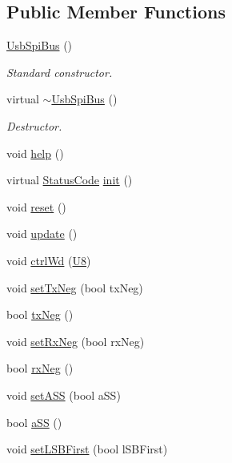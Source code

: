 \subsection*{Public Member Functions}
\begin{DoxyCompactItemize}
\item 
\hyperlink{classUsbSpiBus_a75b47c1938d8ee80eb3a32f19765b05e}{UsbSpiBus} ()
\begin{DoxyCompactList}\small\item\em Standard constructor. \item\end{DoxyCompactList}\item 
virtual \hyperlink{classUsbSpiBus_abeabcef3ac01134582fe275c89b9922f}{$\sim$UsbSpiBus} ()
\begin{DoxyCompactList}\small\item\em Destructor. \item\end{DoxyCompactList}\item 
void \hyperlink{classUsbSpiBus_a3543b3bbad0c137fde32fdc554a09a5d}{help} ()
\item 
virtual \hyperlink{classStatusCode}{StatusCode} \hyperlink{classUsbSpiBus_a38203aaf0806b9a1c7cc0686831a7ce9}{init} ()
\item 
void \hyperlink{classUsbSpiBus_aa795a27f7429f0c0285056964659d433}{reset} ()
\item 
void \hyperlink{classUsbSpiBus_a3e26195827351bf88db56dafd1e7de26}{update} ()
\item 
void \hyperlink{classUsbSpiBus_a150304008d73d14c93d25765050ddb05}{ctrlWd} (\hyperlink{classUsbSpiBus_a11336f4ad104fbd4fb454be044f19fc8}{U8})
\item 
void \hyperlink{classUsbSpiBus_a6b15114d79e0d8002ba42f0301ff22a1}{setTxNeg} (bool txNeg)
\item 
bool \hyperlink{classUsbSpiBus_a08605d71903fc384ed119842833485f1}{txNeg} ()
\item 
void \hyperlink{classUsbSpiBus_aa6c039bb03737e9fd943cbdd2b23388c}{setRxNeg} (bool rxNeg)
\item 
bool \hyperlink{classUsbSpiBus_ab24f6e85697305b26997b8dec3f18254}{rxNeg} ()
\item 
void \hyperlink{classUsbSpiBus_a1a0278c7994ba1fa84919383bd816047}{setASS} (bool aSS)
\item 
bool \hyperlink{classUsbSpiBus_afd9b0823f348dddc7fed8ae97d248e9c}{aSS} ()
\item 
void \hyperlink{classUsbSpiBus_ab601d59e0b5110c2275c1cc298664e27}{setLSBFirst} (bool lSBFirst)

\end{DoxyCompactItemize}
